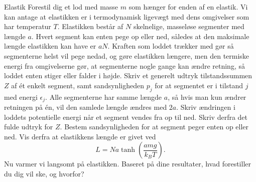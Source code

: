 \begin{opgave}{Elastik}
    Forestil dig et lod med masse $m$ som hænger for enden af en elastik. Vi kan antage at elastikken er i termodynamisk ligevægt med dens omgivelser som har temperatur $T$. Elastikken består af $N$ skelnelige, masseløse segmenter med længde $a$. Hvert segment kan enten pege op eller ned, således at den maksimale længde elastikken kan have er $aN$. Kraften som loddet trækker med gør så segmenterne helst vil pege nedad, og gøre elastikken længere, men den termiske energi fra omgivelserne gør, at segmenterne nogle gange kan ændre retning, så loddet enten stiger eller falder i højde.
    \opg Skriv et generelt udtryk tilstandssummen $Z$ af ét enkelt segment, samt sandsynligheden $p_j$ for at segmentet er i tilstand $j$ med energi $\epsilon_j$.
    \opg Alle segmenterne har samme længde $a$, så hvis man kun ændrer retningen på én, vil den samlede længde ændres med $2a$. Skriv ændringen i loddets potentielle energi når et segment vendes fra op til ned. Skriv derfra det fulde udtryk for $Z$.
    \opg Bestem sandsynligheden for at segment peger enten op eller ned. Vis derfra at elastikkens længde er givet ved
    \[ L=Na\tanh\left(\frac{amg}{k_BT}\right). \]
    \opg Nu varmer vi langsomt på elastikken. Baseret på dine resultater, hvad forestiller du dig vil ske, og hvorfor?
\end{opgave}